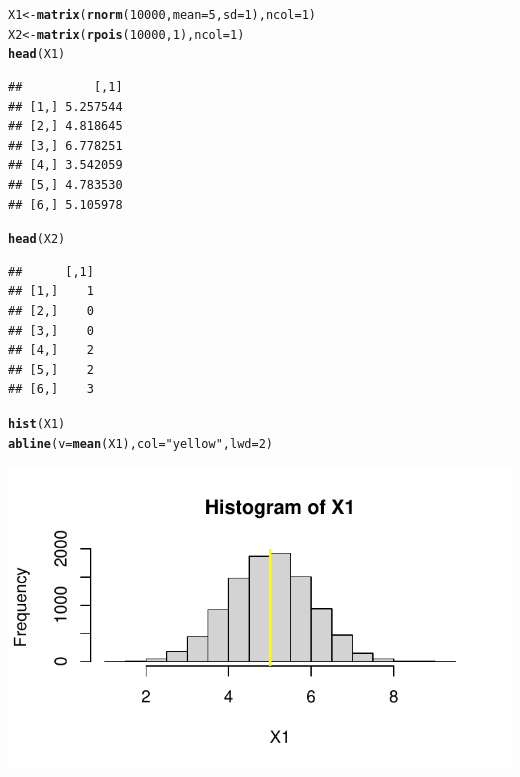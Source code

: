 \documentclass{article}\usepackage[]{graphicx}\usepackage[]{color}
\makeatletter
\def\maxwidth{ %
  \ifdim\Gin@nat@width>\linewidth
    \linewidth
  \else
    \Gin@nat@width
  \fi
}
\newcommand{\hlnum}[1]{\textcolor[rgb]{0.686,0.059,0.569}{#1}}%
\newcommand{\hlstr}[1]{\textcolor[rgb]{0.192,0.494,0.8}{#1}}%
\newcommand{\hlstd}[1]{\textcolor[rgb]{0.345,0.345,0.345}{#1}}%
\newcommand{\hlkwb}[1]{\textcolor[rgb]{0.69,0.353,0.396}{#1}}%
\newcommand{\hlkwc}[1]{\textcolor[rgb]{0.333,0.667,0.333}{#1}}%
\newcommand{\hlkwd}[1]{\textcolor[rgb]{0.737,0.353,0.396}{\textbf{#1}}}%
\newenvironment{kframe}{%
 \def\at@end@of@kframe{}%
 \ifinner\ifhmode%
  \def\at@end@of@kframe{\end{minipage}}%
  \begin{minipage}{\columnwidth}%
 \fi\fi%
 \def\FrameCommand##1{\hskip\@totalleftmargin \hskip-\fboxsep
 \colorbox{shadecolor}{##1}\hskip-\fboxsep
     \hskip-\linewidth \hskip-\@totalleftmargin \hskip\columnwidth}%
 \MakeFramed {\advance\hsize-\width
   \@totalleftmargin\z@ \linewidth\hsize
   \@setminipage}}%
 {\par\unskip\endMakeFramed%
 \at@end@of@kframe}
\newenvironment{knitrout}{}{} %
\makeatother
\begin{document}
\vspace*{0.5cm}
\begin{knitrout}
\color{fgcolor}\begin{kframe}
\begin{alltt}
\hlstd{X1} \hlkwb{<-} \hlkwd{matrix}\hlstd{(}\hlkwd{rnorm}\hlstd{(}\hlnum{10000}\hlstd{,} \hlkwc{mean} \hlstd{=} \hlnum{5}\hlstd{,} \hlkwc{sd} \hlstd{=} \hlnum{1}\hlstd{),}\hlkwc{ncol} \hlstd{=} \hlnum{1}\hlstd{)}
\hlstd{X2} \hlkwb{<-} \hlkwd{matrix}\hlstd{(}\hlkwd{rpois}\hlstd{(}\hlnum{10000}\hlstd{,} \hlnum{1}\hlstd{),}\hlkwc{ncol} \hlstd{=} \hlnum{1}\hlstd{)}
\hlkwd{head}\hlstd{(X1)}
\end{alltt}
\begin{verbatim}
##          [,1]
## [1,] 5.257544
## [2,] 4.818645
## [3,] 6.778251
## [4,] 3.542059
## [5,] 4.783530
## [6,] 5.105978
\end{verbatim}
\begin{alltt}
\hlkwd{head}\hlstd{(X2)}
\end{alltt}
\begin{verbatim}
##      [,1]
## [1,]    1
## [2,]    0
## [3,]    0
## [4,]    2
## [5,]    2
## [6,]    3
\end{verbatim}
\end{kframe}
\end{knitrout}

\begin{knitrout}
\color{fgcolor}\begin{kframe}
\begin{alltt}
\hlkwd{hist}\hlstd{(X1)}
\hlkwd{abline}\hlstd{(}\hlkwc{v} \hlstd{=} \hlkwd{mean}\hlstd{(X1),} \hlkwc{col} \hlstd{=} \hlstr{"yellow"}\hlstd{,} \hlkwc{lwd} \hlstd{=} \hlnum{2}\hlstd{)}
\end{alltt}
\end{kframe}
\includegraphics[width=\maxwidth]{figure/unnamed-chunk-7-1} 
\end{knitrout}
\end{document}
